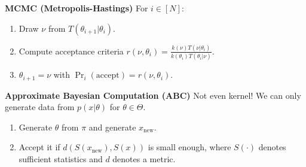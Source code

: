\documentclass[5pt,a4paper, twocolumn]{article}
\newcommand{\keypoint}[1]{\textbf{#1}}
\begin{document}
{\keypoint{MCMC (Metropolis-Hastings)}
For $i\in[N]$:
\begin{enumerate}
    \item Draw $\nu$ from $T(\theta_{i+1} \vert \theta_i)$.
    \item Compute acceptance criteria $r(\nu, \theta_{i}) = \frac{k(\nu)T(\nu \vert \theta_{i})}{k(\theta_i)T(\theta_i \vert \nu)}$.
    \item $\theta_{i+1}=\nu$ with $\Pr_i(\text{accept})=r(\nu, \theta_i)$.
\end{enumerate}

\keypoint{Approximate Bayesian Computation (ABC)} Not even kernel! We can only generate data from $p(x \vert \theta)$ for $\theta \in \Theta$. 
\begin{enumerate}
    \item Generate $\theta$ from $\pi$ and generate $x_{\text{new}}$.
    \item Accept it if $d(S(x_{\text{new}}), S(x))$ is small enough, where $S(\cdot)$ denotes sufficient statistics and $d$ denotes a metric.
\end{enumerate}

}
\end{document}
